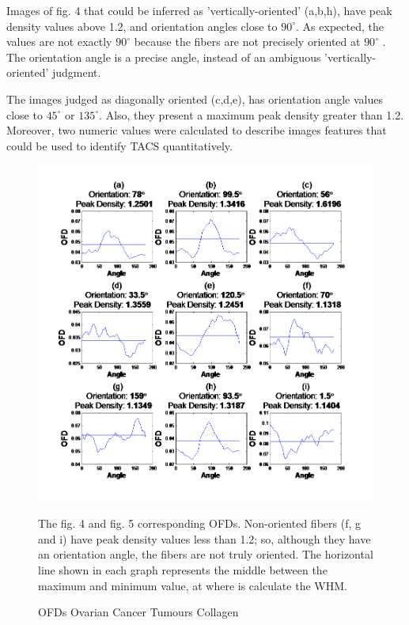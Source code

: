 \documentclass[12pt,a4paper]{article}
\begin{document}
Images of fig. 4 that could be inferred as 'vertically-oriented' (a,b,h), have peak density values above 1.2, and orientation angles close to $90^{\circ}$. As expected, the values are not exactly  $90^{\circ}$  because the fibers are not precisely oriented at  $90^{\circ}$ . The orientation angle is a precise angle, instead of an ambiguous 'vertically-oriented' judgment.  

The images judged as diagonally oriented (c,d,e), has orientation angle values close to  $45^{\circ}$ or  $135^{\circ}$. Also, they present a maximum peak density greater than 1.2. Moreover, two numeric values were calculated to describe images features that could be used to identify TACS quantitatively.


\begin{figure}
  \includegraphics[width=\linewidth]{FiguresDisertation/figure7.png}
  \caption{OFDs Ovarian Cancer Tumours Collagen}
  \medskip
  \small
  The fig. 4 and fig. 5 corresponding OFDs. Non-oriented fibers (f, g and i) have peak density values less than 1.2; so, although they have an orientation angle, the fibers are not truly oriented. The horizontal line shown in each graph represents the middle between the maximum and minimum value, at where is calculate the WHM.
  
\end{figure}
\end{document}
